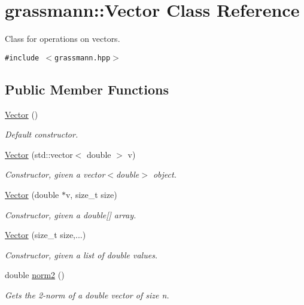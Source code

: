 \hypertarget{classgrassmann_1_1Vector}{
\section{grassmann::Vector Class Reference}
\label{classgrassmann_1_1Vector}
}
Class for operations on vectors.  


{\tt \#include $<$grassmann.hpp$>$}

\subsection*{Public Member Functions}
\begin{CompactItemize}
\item 
\hyperlink{classgrassmann_1_1Vector_aa833e1ac1753a65c2885a9ce88ffeff}{Vector} ()
\begin{CompactList}\small\item\em Default constructor. \item\end{CompactList}\item 
\hyperlink{classgrassmann_1_1Vector_d8278186455c0ecbe065541a6c18a768}{Vector} (std::vector$<$ double $>$ v)
\begin{CompactList}\small\item\em Constructor, given a vector$<$double$>$ object. \item\end{CompactList}\item 
\hyperlink{classgrassmann_1_1Vector_5d7bb89bb3d2d8aa26309ca97ddcad66}{Vector} (double $\ast$v, size\_\-t size)
\begin{CompactList}\small\item\em Constructor, given a double\mbox{[}\mbox{]} array. \item\end{CompactList}\item 
\hyperlink{classgrassmann_1_1Vector_62ece542ba7c51a22866f6b8514f33ef}{Vector} (size\_\-t size,...)
\begin{CompactList}\small\item\em Constructor, given a list of double values. \item\end{CompactList}\item 
double \hyperlink{classgrassmann_1_1Vector_1c53c0f4829396b3db7aa4096d37d605}{norm2} ()
\begin{CompactList}\small\item\em Gets the 2-norm of a double vector of size n. \item\end{CompactList}\item 

\end{CompactItemize}
